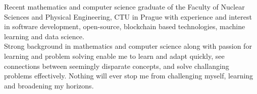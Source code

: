 \documentclass[9pt]{developercv} %
\begin{document}
\vspace{0.5cm}



\begin{minipage}[t]{1\textwidth} %
	\vspace{-\baselineskip} %
Recent mathematics and computer science graduate of the Faculty of Nuclear Sciences and Physical Engineering, CTU in Prague with experience and interest in software development, open-source, blockchain based technologies, machine learning and data science.\\

Strong background in mathematics and computer science along with passion for learning and problem solving enable me to learn and adapt quickly, see connections between seemingly disparate concepts, and solve challanging problems effectively. Nothing will ever stop me from challenging myself, learning and broadening my horizons.

\end{minipage}
\hfill %

   \begin{center}
    \end{center}

\end{document}

